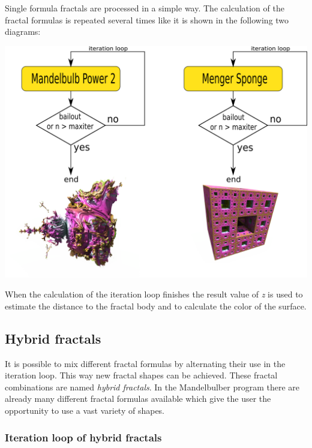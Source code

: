 Single formula fractals are processed in a simple way. The calculation of the fractal
formulas is repeated several times like it is shown in the following two
diagrams:\nolinebreak \nopagebreak

\includegraphics[width=\linewidth]{img/manual/media/iteration_loops.png}

When the calculation of the iteration loop finishes the result value of \emph{z} is
used to estimate the distance to the fractal body and to calculate the color of the surface.

\subsection{Hybrid fractals}

It is possible to mix different fractal formulas by alternating their use in the iteration loop.
This way new fractal shapes can be achieved. These fractal combinations are named \emph{hybrid fractals}. 
In the Mandelbulber program there are already many different fractal formulas available which give the user 
the opportunity to use a vast variety of shapes.

\subsubsection{Iteration loop of hybrid fractals}

